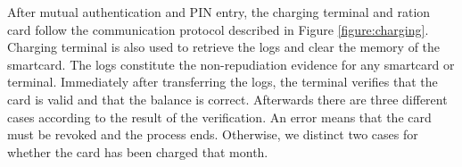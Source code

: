 

After mutual authentication and PIN entry, the charging terminal and ration card follow the communication protocol described in Figure \ref{figure:charging}. Charging terminal is also used to retrieve the logs and clear the memory of the smartcard. The logs constitute the non-repudiation evidence for any smartcard or terminal. Immediately after transferring the logs, the terminal verifies that the card is valid and that the balance is correct. Afterwards there are three different cases according to the result of the verification. An error means that the card must be revoked and the process ends. Otherwise, we distinct two cases for whether the card has been charged that month. 

\usetikzlibrary{matrix,shapes,arrows,positioning,chains, calc}

